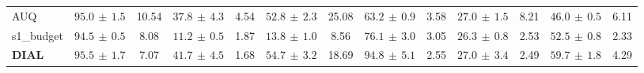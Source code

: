\begin{table}[t]
{\begin{tabular}{l *{6}{rc} }
AUQ & \cellcolor[HTML]{E5EDF7}$95.0{\scriptscriptstyle\,\pm\,1.5}$ & 10.54 & \cellcolor[HTML]{E5EDF7}$37.8{\scriptscriptstyle\,\pm\,4.3}$ & 4.54 & $52.8{\scriptscriptstyle\,\pm\,2.3}$ & 25.08 & $63.2{\scriptscriptstyle\,\pm\,0.9}$ & 3.58 & $27.0{\scriptscriptstyle\,\pm\,1.5}$ & 8.21 & $46.0{\scriptscriptstyle\,\pm\,0.5}$ & 6.11 \\
s1\_budget & $94.5{\scriptscriptstyle\,\pm\,0.5}$ & 8.08 & $11.2{\scriptscriptstyle\,\pm\,0.5}$ & 1.87 & $13.8{\scriptscriptstyle\,\pm\,1.0}$ & 8.56 & $76.1{\scriptscriptstyle\,\pm\,3.0}$ & 3.05 & $26.3{\scriptscriptstyle\,\pm\,0.8}$ & 2.53 & $52.5{\scriptscriptstyle\,\pm\,0.8}$ & 2.33 \\
\textbf{DIAL} & \cellcolor[HTML]{FBE7EB}$95.5{\scriptscriptstyle\,\pm\,1.7}$ & 7.07 & \cellcolor[HTML]{FBE7EB}$41.7{\scriptscriptstyle\,\pm\,4.5}$ & 1.68 & \cellcolor[HTML]{E5EDF7}$54.7{\scriptscriptstyle\,\pm\,3.2}$ & 18.69 & \cellcolor[HTML]{FBE7EB}$94.8{\scriptscriptstyle\,\pm\,5.1}$ & 2.55 & \cellcolor[HTML]{E5EDF7}$27.0{\scriptscriptstyle\,\pm\,3.4}$ & 2.49 & \cellcolor[HTML]{FBE7EB}$59.7{\scriptscriptstyle\,\pm\,1.8}$ & 4.29 \\
\bottomrule
\end{tabular}%
}
\end{table}
